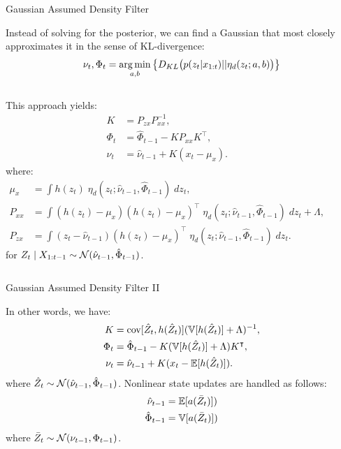 \documentclass[aspectratio=169,19pt,xetex,handout]{beamer}
\begin{document}
\begin{frame}{Gaussian Assumed Density Filter}

Instead of solving for the posterior, we can find a Gaussian that most closely approximates it in the sense of KL-divergence:
\[
\nu_t, \Phi_t = \operatorname*{\arg\min}_{a,b} \big\{D_{KL}\big(p(z_t|x_{1:t}) || \eta_d(z_t; a,b)\big)\big\}
\]
\begin{columns}
This approach yields:
\begin{align*}
K &= P_{zx}P_{xx}^{-1}, \\
\Phi_t &= \hat\Phi_{t-1} - KP_{xx}K^\intercal , \\
\nu_t &= \hat\nu_{t-1} + K(x_t - \mu_x) .
\end{align*}
where:
\begin{align*}
\mu_x &= \int h(z_t)\; \eta_d(z_t;\hat\nu_{t-1},\hat\Phi_{t-1})\; dz_t,\\
P_{xx} &= \int (h(z_t)-\mu_x) (h(z_t)-\mu_x)^\intercal \; \eta_d(z_t;\hat\nu_{t-1},\hat\Phi_{t-1})\; dz_t + \Lambda , \\
P_{zx} &= \int (z_t-\hat\nu_{t-1}) (h(z_t)-\mu_x)^\intercal \; \eta_d(z_t;\hat\nu_{t-1},\hat\Phi_{t-1})\; dz_t.
\end{align*}
for $Z_t \mid X_{1:t-1} \sim \mathcal{N}(\hat\nu_{t-1},\hat\Phi_{t-1})$.
\end{columns}

\end{frame}

\begin{frame}{Gaussian Assumed Density Filter II}

In other words, we have:
\begin{align*}
K &= \operatorname{cov}[\hat Z_t, h(\hat Z_t)] (\operatorname{\mathbb{V}}[h(\hat Z_t)] + \Lambda)^{-1}, \\
\Phi_t &= \hat\Phi_{t-1} - K(\operatorname{\mathbb{V}}[h(\hat Z_t)] + \Lambda)K^\intercal , \\
\nu_t &= \hat\nu_{t-1} + K(x_t - \operatorname{\mathbb{E}}[h(\hat Z_t)]) .
\end{align*}
where $\hat Z_t\sim \mathcal{N}(\hat\nu_{t-1},\hat\Phi_{t-1})$.  Nonlinear state updates are handled as follows:
\begin{align*}
\hat\nu_{t-1} &= \operatorname{\mathbb{E}}[a(\bar Z_t)]) \\
\hat\Phi_{t-1} &= \operatorname{\mathbb{V}}[a(\bar Z_t)]) \\
\end{align*}
where $\bar Z_t\sim \mathcal{N}(\nu_{t-1},\Phi_{t-1})$.

\end{frame}
\end{document}
